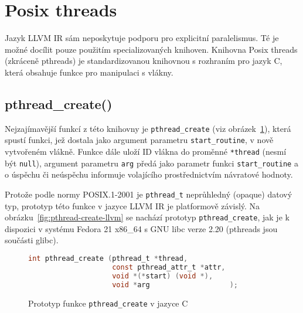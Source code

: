 \documentclass[12pt]{fithesis2}
\begin{document}


\section{Posix threads}
\label{sec:posix-threads}
Jazyk LLVM IR sám neposkytuje podporu pro explicitní paralelismus. Té je možné docílit pouze použitím specializovaných knihoven. Knihovna Posix threads (zkráceně pthreads) je standardizovanou knihovnou s rozhraním pro jazyk C, která obsahuje funkce pro manipulaci s vlákny.

\subsection{pthread_create()}
Nejzajímavější funkcí z této knihovny je \texttt{pthread\_create}\cite{man-pthread-create} (viz obrázek~\ref{fig:pthread-create-c}), která spustí funkci, jež dostala jako argument parametru \texttt{start\_routine}, v nově vytvořeném vlákně. Funkce dále uloží ID vlákna do proměnné \texttt{*thread} (nesmí být \texttt{null}), argument parametru \texttt{arg} předá jako parametr funkci \texttt{start\_routine} a o úspěchu či neúspěchu informuje volajícího prostřednictvím návratové hodnoty.

Protože podle normy POSIX.1-2001 \cite{posix} je \texttt{pthread\_t} neprůhledný (opaque) datový typ, prototyp této funkce v jazyce LLVM IR je platformově závislý. Na obrázku~\ref{fig:pthread-create-llvm} se nachází prototyp \texttt{pthread\_create}, jak je k dispozici v systému Fedora 21 x86_64 s GNU libc verze 2.20 (pthreads jsou součásti glibc).

\begin{figure}[h!]
\begin{lstlisting}[language=C]
int pthread_create (pthread_t *thread,
                    const pthread_attr_t *attr,
                    void *(*start) (void *),
                    void *arg                   );
\end{lstlisting}
\label{fig:pthread-create-c}
\caption{Prototyp funkce \texttt{pthread_create} v jazyce C}
\end{figure}
\end{document}
